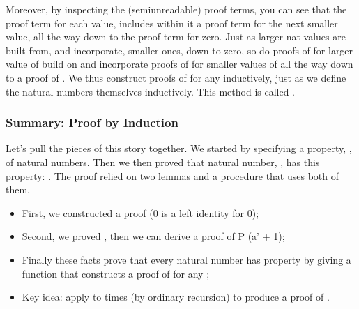 \documentclass[letterpaper,10pt,english]{sphinxmanual}
\begin{document}
\sphinxAtStartPar
Moreover, by inspecting the (semi\sphinxhyphen{}unreadable) proof
terms, you can see that the proof term for each value,
 includes within it a proof term for the next smaller
value, all the way down to the proof term for zero. Just
as larger nat values are built from, and incorporate,
smaller ones, down to zero, so do proofs of  for
larger value of  build on and incorporate proofs of
 for smaller values of  all the way down to
a proof of . We thus construct proofs of  for
any  inductively, just as we define the natural numbers
themselves inductively. This method is called .


\subsubsection{Summary: Proof by Induction}
\label{\detokenize{A_03_Recursive_Types:summary-proof-by-induction}}
\sphinxAtStartPar
Let’s pull the pieces of this story together. We started by
specifying a property, , of natural numbers.
Then we then proved that  natural number, , has this
property: . The proof relied on two lemmas and
a procedure that uses both of them.
\begin{itemize}
\item {} 
\sphinxAtStartPar
First, we constructed a proof  (0 is a left identity for 0);

\item {} 
\sphinxAtStartPar
Second, we proved , then we can derive a proof of P (a’ + 1);

\item {} 
\sphinxAtStartPar
Finally these facts prove that every natural number  has property  by giving a function that constructs a proof of  for any ;

\item {} 
\sphinxAtStartPar
Key idea: apply  to  times (by ordinary recursion) to produce a proof of .

\end{itemize}
\end{document}
